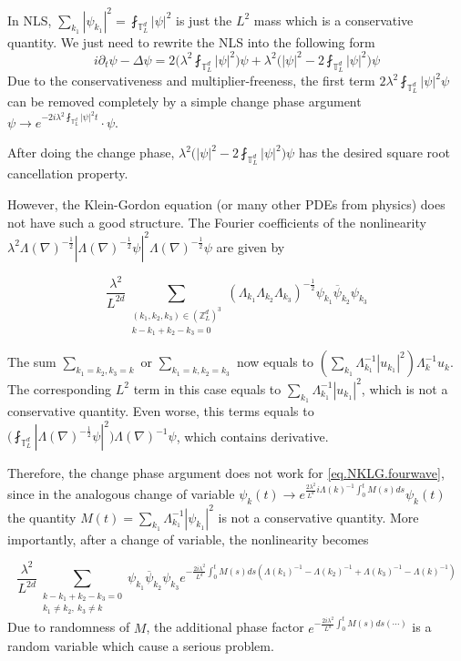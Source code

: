 In NLS, $ \sum_{k_1}|\psi_{k_1}|^2 = \fint_{\mathbb{T}_L^d}|\psi|^2$ is just the $L^2$ mass which is a conservative quantity. We just need to rewrite the NLS into the following form 
\begin{equation}
 i\partial_t\psi-\Delta\psi = 2\bigg(\lambda^2\fint_{\mathbb{T}_L^d}|\psi|^2\bigg)\psi + \lambda^2\bigg(|\psi|^2-2\fint_{\mathbb{T}_L^d}|\psi|^2\bigg)\psi
\end{equation}
Due to the conservativeness and multiplier-freeness, the first term $2\lambda^2\fint_{\mathbb{T}_L^d}|\psi|^2\psi$ can be removed completely by a simple change phase argument $\psi \rightarrow e^{-2i\lambda^2\fint_{\mathbb{T}_L^d}|\psi|^2t}\cdot \psi$. 

After doing the change phase, $\lambda^2\bigg(|\psi|^2-2\fint_{\mathbb{T}_L^d}|\psi|^2\bigg)\psi$ has the desired square root cancellation property.

However, the Klein-Gordon equation (or many other PDEs from physics) does not have such a good structure. The Fourier coefficients of the nonlinearity $\lambda^2 \Lambda(\nabla)^{-\frac{1}{2}}|\Lambda(\nabla)^{-\frac{1}{2}}\psi|^2\Lambda(\nabla)^{-\frac{1}{2}}\psi$ are given by

\begin{equation}
 \frac{\lambda^2}{L^{2d}} \sum\limits_{\substack{(k_1,k_2,k_{3}) \in (\mathbb{Z}^d_L)^3 \\ k - k_1 + k_2 -k_3 = 0}} (\Lambda_{k_1}\Lambda_{k_2}\Lambda_{k_3})^{-\frac{1}{2}}\psi_{k_1}\overline{\psi}_{k_2} \psi_{k_3}
\end{equation}

The sum $\sum_{k_1=k_2,k_3=k}$ or $\sum_{k_1=k,k_2=k_3}$ now equals to $ (\sum_{k_1}\Lambda_{k_1}^{-1}|u_{k_1}|^2) \Lambda_{k}^{-1}u_k$. The corresponding $L^2$ term in this case equals to $\sum_{k_1}\Lambda_{k_1}^{-1}|u_{k_1}|^2$, which is not a conservative quantity. Even worse, this terms equals to $\bigg(\fint_{\mathbb{T}_L^d}|\Lambda(\nabla)^{-\frac{1}{2}}\psi|^2\bigg)\Lambda(\nabla)^{-1}\psi $, which contains derivative. 


Therefore, the change phase argument does not work for \eqref{eq.NKLG.fourwave}, since in the analogous change of variable $\psi_k(t)\rightarrow e^{\frac{2\lambda^2}{L^{d}} i \Lambda(k)^{-1}\int^t_{0}M(s) ds} \psi_k(t)$ the quantity $M(t)=\sum_{k_1}\Lambda_{k_1}^{-1}|\psi_{k_1}|^2$ is not a conservative quantity. More importantly, after a change of variable, the nonlinearity becomes

\begin{equation}
\frac{\lambda^2}{L^{2d}} \sum\limits_{\substack{k - k_1 + k_2 -k_3 = 0 \\ k_1\ne k_2,\ k_3 \ne k}} \psi_{k_1}\overline{\psi}_{k_2} \psi_{k_3} e^{- \frac{2i\lambda^2}{L^{d}} \int^t_{0}M(s) ds\left(\Lambda(k_1)^{-1}-\Lambda(k_2)^{-1}+\Lambda(k_3)^{-1}-\Lambda(k)^{-1}\right)} 
\end{equation}
Due to randomness of $M$, the additional phase factor $e^{- \frac{2i\lambda^2}{L^{d}} \int^t_{0}M(s) ds(\cdots)}$ is a random variable which cause a serious problem. 


